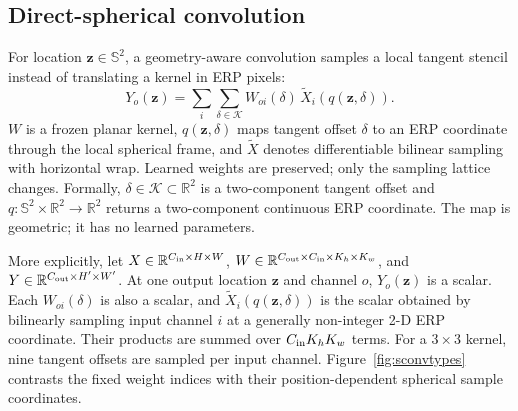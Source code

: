 \documentclass[a4paper,9pt]{extarticle}
\newcommand{\sphere}{\mathbb S^2}
\newcommand{\R}{\mathbb R}
\begin{document}
\subsection{Direct-spherical convolution}

For location $\mathbf z\in\sphere$, a geometry-aware convolution samples a local tangent stencil instead of translating a kernel in ERP pixels:
\begin{equation}
 Y_o(\mathbf z)=\sum_i\sum_{\delta\in\mathcal K}
 W_{oi}(\delta)\,
 \widetilde X_i\!\left(q(\mathbf z,\delta)\right).
 \label{eq:sconv}
\end{equation}
$W$ is a frozen planar kernel, $q(\mathbf z,\delta)$ maps tangent offset $\delta$ to an ERP coordinate through the local spherical frame, and $\widetilde X$ denotes differentiable bilinear sampling with horizontal wrap. Learned weights are preserved; only the sampling lattice changes.
Formally, $\delta\in\mathcal K\subset\R^2$ is a two-component tangent offset
and $q:\sphere\times\R^2\rightarrow\R^2$ returns a two-component continuous
ERP coordinate. The map is geometric; it has no learned parameters.

More explicitly, let
$X\in\R^{C_{\rm in}\times H\times W}$,
$W\in\R^{C_{\rm out}\times C_{\rm in}\times K_h\times K_w}$, and
$Y\in\R^{C_{\rm out}\times H'\times W'}$. At one output location $\mathbf z$ and
channel $o$, $Y_o(\mathbf z)$ is a scalar. Each
$W_{oi}(\delta)$ is also a scalar, and
$\widetilde X_i(q(\mathbf z,\delta))$ is the scalar obtained by bilinearly sampling
input channel $i$ at a generally non-integer 2-D ERP coordinate. Their products
are summed over $C_{\rm in}K_hK_w$ terms. For a $3\times3$ kernel, nine tangent
offsets are sampled per input channel. Figure~\ref{fig:sconvtypes} contrasts
the fixed weight indices with their position-dependent spherical sample
coordinates.
\end{document}
